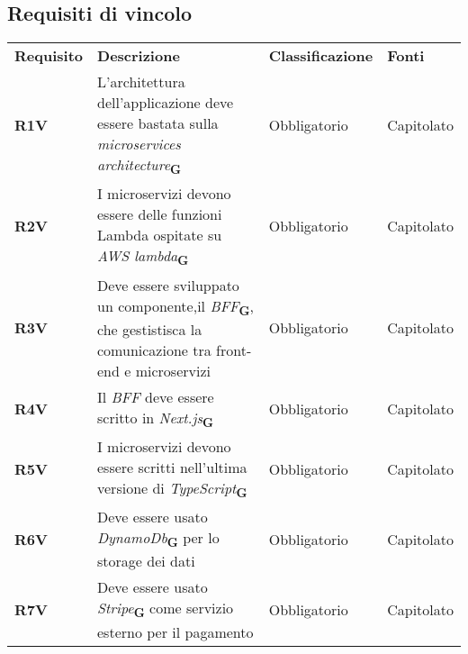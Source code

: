 \newpage
\subsection{Requisiti di vincolo}
\begin{center}
    \centering
    \renewcommand{\arraystretch}{1.8}
    \label{tab:RequisitiVincolo}
    \begin{longtable}[!h]{p{50px} p{200px} p{100px} p{50px}}
        \rowcolor{logo!70} \textbf{Requisito} & \textbf{Descrizione}                                                                                                                                   & \textbf{Classificazione} & \textbf{Fonti} \\
        \textbf{R1V}                          & L'architettura dell'applicazione deve essere bastata sulla \textit{microservices architecture}\textsubscript{\textbf{G}}                               & Obbligatorio             & Capitolato     \\
        \textbf{R2V}                          & I microservizi devono essere delle funzioni \newline Lambda ospitate su \textit{AWS lambda}\textsubscript{\textbf{G}}                                  & Obbligatorio             & Capitolato     \\
        \textbf{R3V}                          & Deve essere sviluppato un componente,\newline il \textit{BFF}\textsubscript{\textbf{G}}, che gestistisca la comunicazione tra front-end e microservizi & Obbligatorio             & Capitolato     \\
        \textbf{R4V}                          & Il \textit{BFF} deve essere scritto in \textit{Next.js}\textsubscript{\textbf{G}}                                                                      & Obbligatorio             & Capitolato     \\
        \textbf{R5V}                          & I microservizi devono essere scritti nell'ultima versione di \textit{TypeScript}\textsubscript{\textbf{G}}                                             & Obbligatorio             & Capitolato     \\
        \textbf{R6V}                          & Deve essere usato \textit{DynamoDb}\textsubscript{\textbf{G}} per lo storage dei dati                                                                  & Obbligatorio             & Capitolato     \\
        \textbf{R7V}                          & Deve essere usato \textit{Stripe}\textsubscript{\textbf{G}} come servizio esterno per il pagamento                                                     & Obbligatorio             & Capitolato     \\

\end{longtable}
\end{center}
